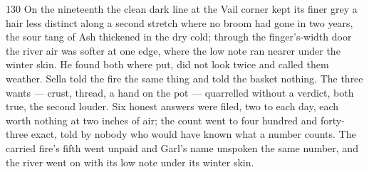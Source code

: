 \begin{CRchronicle}{130}
On the nineteenth the clean dark line at the Vail corner kept its finer grey a hair less distinct along a second stretch where no broom had gone in two years, the sour tang of Ash thickened in the dry cold; through the finger’s-width door the river air was softer at one edge, where the low note ran nearer under the winter skin. He found both where put, did not look twice and called them weather. Sella told the fire the same thing and told the basket nothing. The three wants — crust, thread, a hand on the pot — quarrelled without a verdict, both true, the second louder. Six honest answers were filed, two to each day, each worth nothing at two inches of air; the count went to four hundred and forty-three exact, told by nobody who would have known what a number counts. The carried fire’s fifth went unpaid and Garl’s name unspoken the same number, and the river went on with its low note under its winter skin.
\end{CRchronicle}

